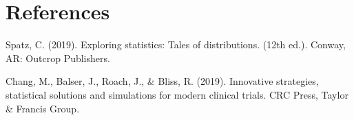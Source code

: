 \documentclass{article}
\begin{document}
\newpage

\section{References}

Spatz, C. (2019). Exploring statistics: Tales of distributions. (12th ed.). Conway, AR: Outcrop Publishers. 

\vspace{5mm}

\noindent Chang, M., Balser, J., Roach, J., \& Bliss, R. (2019). Innovative strategies, statistical solutions and
simulations for modern clinical trials. CRC Press, Taylor \& Francis Group.
\end{document}
